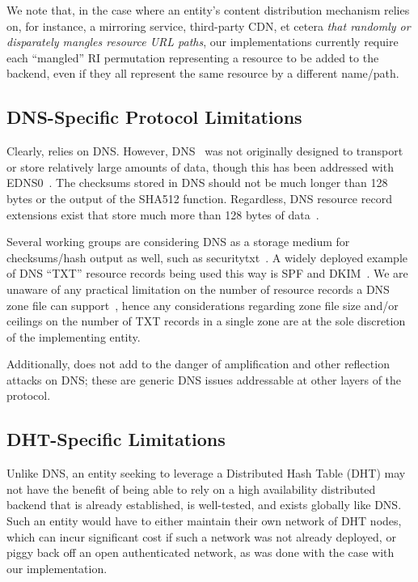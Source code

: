 We note that, in the case where an entity's content distribution mechanism
relies on, for instance, a mirroring service, third-party CDN, et cetera
\emph{that randomly or disparately mangles resource URL paths}, our
implementations currently require each ``mangled'' RI permutation representing a
resource to be added to the backend, even if they all represent the same
resource by a different name/path.

\subsection{DNS-Specific Protocol Limitations}

Clearly, \DNSSYS{} relies on DNS. However, DNS~\cite{DNS1} was not originally
designed to transport or store relatively large amounts of data, though this has
been addressed with EDNS0~\cite{EDNS}. The checksums stored in DNS should not be
much longer than 128 bytes or the output of the SHA512 function. Regardless, DNS
resource record extensions exist that store much more than 128 bytes of
data~\cite{CERT, IPSECKEY, DANE3, DANE1}.

Several working groups are considering DNS as a storage medium for
checksums/hash output as well, such as securitytxt~\cite{draft-sectxt}. A widely
deployed example of DNS ``TXT'' resource records being used this way is SPF and
DKIM~\cite{DKIM}. We are unaware of any practical limitation on the number of
resource records a DNS zone file can support~\cite{DNS1}, hence any
considerations regarding zone file size and/or ceilings on the number of TXT
records in a single zone are at the sole discretion of the implementing entity.

Additionally, \DNSSYS{} does not add to the danger of amplification and other
reflection attacks on DNS; these are generic DNS issues addressable at other
layers of the protocol.


\subsection{DHT-Specific Limitations}

Unlike DNS, an entity seeking to leverage a Distributed Hash Table (DHT) may not
have the benefit of being able to rely on a high availability distributed
backend that is already established, is well-tested, and exists
globally like DNS. Such an entity would have to either maintain their own
network of DHT nodes, which can incur significant cost if such a network was not
already deployed, or piggy back off an open authenticated network, as was done
with the case with our \DHTSYS{} implementation.

